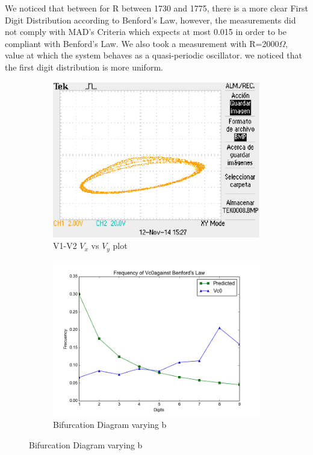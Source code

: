 \begin{itemize}
We noticed that between for R between 1730 and 1775, there is a more clear First Digit Distribution according to Benford's Law, however, the measurements did not comply with MAD's Criteria which expects at most 0.015 in order to be compliant with Benford's Law. We also took a measurement with R=2000$\Omega$, value at which the system behaves as a quasi-periodic oscillator. we noticed that the first digit distribution is more uniform.

\begin{figure}
         \centering
            \begin{subfigure}[b]{0.4\textwidth}
            \includegraphics[width=\textwidth]{imagenes/2-benford/chua_2000.eps}
            \caption{V1-V2 $V_x$ vs $V_y$ plot}
            \end{subfigure}
            \begin{subfigure}[b]{0.8\textwidth}
            \includegraphics[width=\textwidth]{imagenes/2-benford/benford_chua20.png}
            \caption{Bifurcation Diagram varying b}
            \end{subfigure}
\end{figure}

 \end{itemize}

